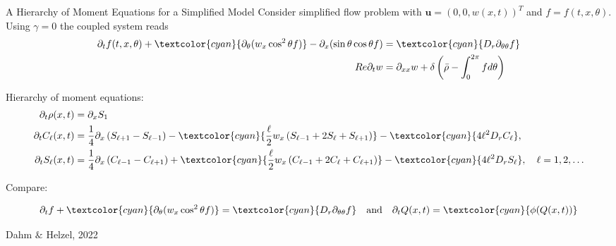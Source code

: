 \begin{frame}{A Hierarchy of Moment Equations for a Simplified Model}
	\scriptsize
	Consider simplified flow problem with $\boldsymbol{u} = (0,0, w(x,t))^T$ and $f=f(t,x,\theta)$. Using $\gamma = 0$ the coupled system reads
	\begin{align*}
		\partial_t f(t,x,\theta) +  \textcolor{cyan}{\partial_\theta(w_x \cos^2 \theta f)} - \partial_x (\sin \theta \cos \theta f) &=  \textcolor{cyan}{D_r \partial_{\theta\theta} f} \\
		R e \partial_t w &=\partial_{x x} w+\delta\left(\bar{\rho}-\int_0^{2 \pi} f d \theta\right)
	\end{align*}

	Hierarchy of moment equations:
	\begin{align*}
		\partial_t \rho(x, t) & = \partial_x S_1 \\
		\partial_t C_{\ell}(x, t) & = \frac{1}{4} \partial_x\left(S_{\ell+1}-S_{\ell-1}\right)- \textcolor{cyan}{\frac{\ell}{2} w_x\left(S_{\ell-1}+2 S_{\ell}+S_{\ell+1}\right)}- \textcolor{cyan}{4 \ell^2 D_r C_{\ell}}, \\
		\partial_t S_{\ell}(x, t) & =\frac{1}{4} \partial_x\left(C_{\ell-1}-C_{\ell+1}\right)+  \textcolor{cyan}{\frac{\ell}{2} w_x\left(C_{\ell-1}+2 C_{\ell}+C_{\ell+1}\right)}- \textcolor{cyan}{4 \ell^2 D_r S_{\ell}}, \quad \ell=1,2, \ldots
	\end{align*}

	Compare:
	
	\begin{align*}
		\partial_t f + \textcolor{cyan}{\partial_\theta(w_x \cos^2 \theta f)} = \textcolor{cyan}{D_r \partial_{\theta\theta} f} \quad \text{and} \quad \partial_t Q(x,t) = \textcolor{cyan}{\phi(Q(x,t))}
	\end{align*}
	
	\begin{beamercolorbox}[sep=1em,wd=\linewidth,right]{}
		\tiny{Dahm $\&$ Helzel, 2022}
	\end{beamercolorbox}
\end{frame}



